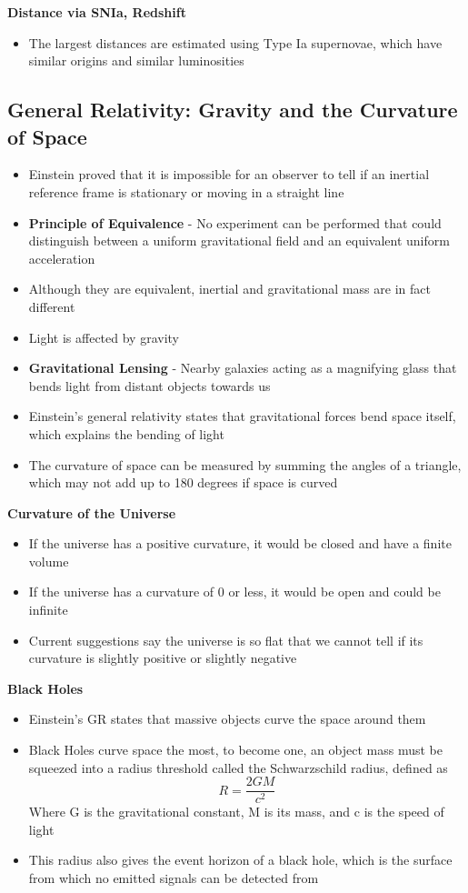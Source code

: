\textbf{Distance via SNIa, Redshift}
\begin{itemize}
    \item The largest distances are estimated using Type Ia supernovae, which have similar origins and similar luminosities
\end{itemize}

\subsection{General Relativity: Gravity and the Curvature of Space}
\begin{itemize}
    \item Einstein proved that it is impossible for an observer to tell if an inertial reference frame is stationary or moving in a straight line
    \item \textbf{Principle of Equivalence} - No experiment can be performed that could distinguish between a uniform gravitational field and an equivalent uniform acceleration
    \item Although they are equivalent, inertial and gravitational mass are in fact different
    \item Light is affected by gravity
    \item \textbf{Gravitational Lensing} - Nearby galaxies acting as a magnifying glass that bends light from distant objects towards us 
    \item Einstein's general relativity states that gravitational forces bend space itself, which explains the bending of light
    \item The curvature of space can be measured by summing the angles of a triangle, which may not add up to 180 degrees if space is curved
\end{itemize}

\textbf{Curvature of the Universe}
\begin{itemize}
    \item If the universe has a positive curvature, it would be closed and have a finite volume
    \item If the universe has a curvature of 0 or less, it would be open and could be infinite 
    \item Current suggestions say the universe is so flat that we cannot tell if its curvature is slightly positive or slightly negative
\end{itemize}

\textbf{Black Holes}
\begin{itemize}
    \item Einstein's GR states that massive objects curve the space around them
    \item Black Holes curve space the most, to become one, an object mass must be squeezed into a radius threshold called the Schwarzschild radius, defined as \[R=\frac{2GM}{c^2}\] Where G is the gravitational constant, M is its mass, and c is the speed of light
    \item This radius also gives the event horizon of a black hole, which is the surface from which no emitted signals can be detected from 
\end{itemize}

